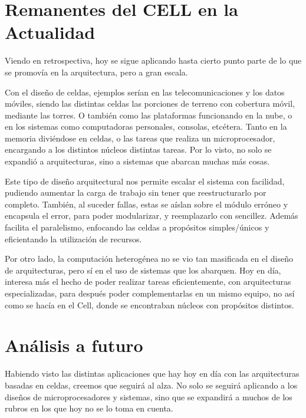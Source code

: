 \documentclass[10pt,compsoc]{IEEEtran}
\begin{document}
	
	\section{Remanentes del CELL en la Actualidad}%
	\noindent Viendo en retrospectiva, hoy se sigue aplicando hasta cierto punto parte de lo que se promovía en la arquitectura, pero a gran escala.\newline
	
	Con el diseño de celdas, ejemplos serían en las telecomunicaciones y los datos móviles, siendo las distintas celdas las porciones de terreno con cobertura móvil, mediante las torres. O también como las plataformas funcionando en la nube, o en los sistemas como computadoras personales, consolas, etcétera. Tanto en la memoria diviéndose en celdas, o las tareas que realiza un microprocesador, encargando a los distintos núcleos distintas tareas. Por lo visto, no solo se expandió a arquitecturas, sino a sistemas que abarcan muchas más cosas.\newline
	
	Este tipo de diseño arquitectural nos permite escalar el sistema con facilidad, pudiendo aumentar la carga de trabajo sin tener que reestructurarlo por completo. También, al suceder fallas, estas se aíslan sobre el módulo erróneo y encapsula el error, para poder modularizar, y reemplazarlo con sencillez. Además facilita el paralelismo, enfocando las celdas a propósitos simples/únicos y eficientando la utilización de recursos.\newline
	
	
	Por otro lado, la computación heterogénea no se vio tan masificada en el diseño de arquitecturas, pero sí en el uso de sistemas que los abarquen. Hoy en día, interesa más el hecho de poder realizar tareas eficientemente, con arquitecturas especializadas, para después poder complementarlas en un mismo equipo, no así como se hacía en el Cell, donde se encontraban núcleos con propósitos distintos. 
		
	\section{Análisis a futuro}
	\noindent Habiendo visto las distintas aplicaciones que hay hoy en día con las arquitecturas basadas en celdas, creemos que seguirá al alza. No solo se seguirá aplicando a los diseños de microprocesadores y sistemas, sino que se expandirá a muchos de los rubros en los que hoy no se lo toma en cuenta.\newline
	
\end{document}
